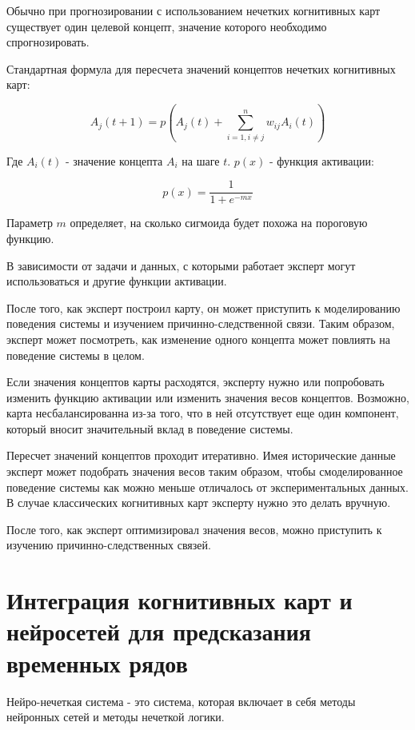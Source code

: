 Обычно при прогнозировании с использованием нечетких когнитивных карт существует один целевой концепт,
значение которого необходимо спрогнозировать.


Стандартная формула для пересчета значений концептов нечетких когнитивных карт:

\begin{equation}\label{eq:concepts_recalc}
	A_j(t+1) = p( A_j(t) + \sum_{i = 1, i \neq j}^{n} w_{ij} A_i(t) )
\end{equation}

\noindent Где $ A_i(t) $ - значение концепта $A_i$ на шаге $t$. $ p(x) $ - функция активации:

\begin{equation}\label{eq:sigmiog_actiovation}
	p(x) = \frac {1} {1+ e^{-mx} }
\end{equation}

\noindent Параметр $ m $ определяет, на сколько сигмоида будет похожа на пороговую функцию.

В зависимости от задачи и данных, с которыми работает эксперт могут использоваться и другие
функции активации.

После того, как эксперт построил карту, он может приступить к моделированию поведения
системы и изучением причинно-следственной связи. Таким образом, эксперт может посмотреть,
как изменение одного концепта может повлиять на поведение системы в целом.

Если значения концептов карты расходятся, эксперту нужно или попробовать изменить функцию
активации или изменить значения весов концептов. Возможно, карта несбалансированна из-за
того, что в ней отсутствует еще один компонент, который вносит значительный вклад в поведение системы.

Пересчет значений концептов проходит итеративно. Имея исторические данные эксперт может
подобрать значения весов таким образом, чтобы смоделированное поведение системы как можно меньше отличалось
от экспериментальных данных. В случае классических когнитивных карт эксперту нужно это делать вручную.

После того, как эксперт оптимизировал значения весов, можно приступить к изучению причинно-следственных
связей.

\section{Интеграция когнитивных карт и нейросетей для предсказания временных рядов}

Нейро-нечеткая система - это система, которая включает в себя методы нейронных сетей и методы нечеткой логики.

